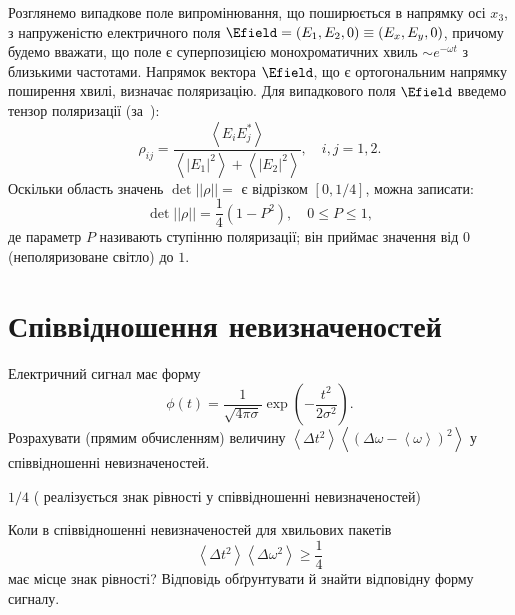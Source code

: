 \begin{Theory}
Розглянемо випадкове поле випромінювання, що поширюється в напрямку осі $x_3$, з напруженістю електричного поля  $\Efield = (E_1,E_2,0) \equiv
(E_x,E_y,0)$, причому будемо вважати, що поле є суперпозицією монохроматичних хвиль $\sim e^{-\omega t}$  з близькими частотами. Напрямок вектора
$\Efield$, що є ортогональним напрямку поширення хвилі, визначає поляризацію. Для випадкового поля $\Efield$ введемо тензор поляризації (за~\cite{LL2}):
	\begin{equation}\label{eq:polarization_tensor}
		\rho_{ij} = \frac{\left\langle E_{i} E_{j}^* \right\rangle }{\left\langle |E_1|^2\right\rangle + \left\langle |E_2|^2\right\rangle },\quad i,j =
		1,2.
	\end{equation}
Оскільки область значень $\det||\rho|| = $ є відрізком $[0,1/4]$, можна записати:
	\begin{equation}\label{eq:polarization_lewel}
		\det||\rho|| = \frac14(1 - P^2),\quad 0\le P \le 1,
	\end{equation}
де параметр $P$ називають ступінню поляризації; він приймає значення від $0$ (неполяризоване світло) до $1$.
\end{Theory}




\section{Співвідношення невизначеностей}

\begin{problem}
Електричний сигнал має форму
\[
	\phi(t) = \frac{1}{\sqrt{4\pi\sigma}} \exp\left( -\frac{t^2}{2\sigma^2}\right).
\]
Розрахувати (прямим обчисленням) величину $\left\langle \Delta t^2 \right\rangle \left\langle \left(\Delta \omega  - \left\langle \omega  \right\rangle\right)^2 \right\rangle$  у співвідношенні невизначеностей.
\begin{solution}
	$1/4$ ( реалізується знак рівності у співвідношенні невизначеностей)
\end{solution}
\end{problem}


\begin{problem}
Коли в співвідношенні невизначеностей для хвильових пакетів
\[
	\left\langle \Delta t^2 \right\rangle\left\langle \Delta \omega^2 \right\rangle \ge \frac14
\]
має місце знак рівності? Відповідь обґрунтувати й знайти відповідну форму сигналу.
\end{problem}


